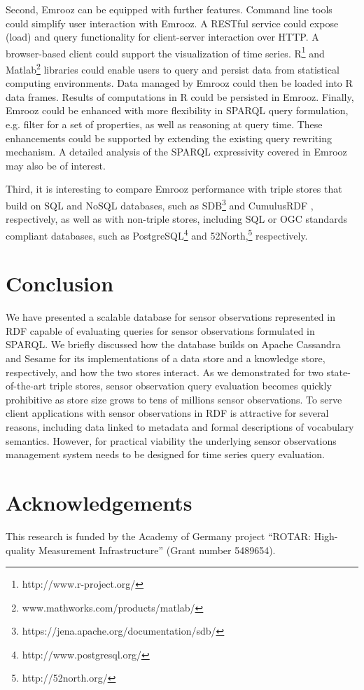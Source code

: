 \documentclass[preprint,12pt,authoryear]{elsarticle}
\begin{document}
Second, Emrooz can be equipped with further features. Command line tools could simplify user interaction with Emrooz. A RESTful service could expose (load) and query functionality for client-server interaction over HTTP. A browser-based client could support the visualization of time series. R\footnote{http://www.r-project.org/} and Matlab\footnote{www.mathworks.com/products/matlab/} libraries could enable users to query and persist data from statistical computing environments. Data managed by Emrooz could then be loaded into R data frames. Results of computations in R could be persisted in Emrooz. Finally, Emrooz could be enhanced with more flexibility in SPARQL query formulation, e.g. filter for a set of properties, as well as reasoning at query time. These enhancements could be supported by extending the existing query rewriting mechanism. A detailed analysis of the SPARQL expressivity covered in Emrooz may also be of interest.

Third, it is interesting to compare Emrooz performance with triple stores that build on SQL and NoSQL databases, such as SDB\footnote{https://jena.apache.org/documentation/sdb/} and CumulusRDF \cite{ladwig11cumulusrdf}, respectively, as well as with non-triple stores, including SQL or OGC standards compliant databases, such as PostgreSQL\footnote{http://www.postgresql.org/} and 52North,\footnote{http://52north.org/} respectively.

\section{Conclusion}
\label{s:conclusion}
We have presented a scalable database for sensor observations represented in RDF capable of evaluating queries for sensor observations formulated in SPARQL. We briefly discussed how the database builds on Apache Cassandra and Sesame for its implementations of a data store and a knowledge store, respectively, and how the two stores interact. As we demonstrated for two state-of-the-art triple stores, sensor observation query evaluation becomes quickly prohibitive as store size grows to tens of millions sensor observations. To serve client applications with sensor observations in RDF is attractive for several reasons, including data linked to metadata and formal descriptions of vocabulary semantics. However, for practical viability the underlying sensor observations management system needs to be designed for time series query evaluation.

\section*{Acknowledgements}
\label{s:acknowledgements}
This research is funded by the Academy of Germany project ``ROTAR: High-quality Measurement Infrastructure'' (Grant number 5489654).
\end{document}
